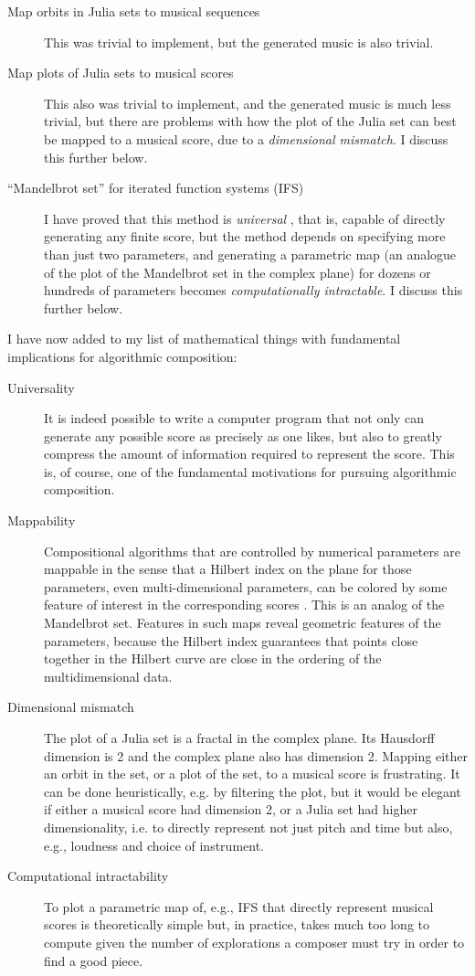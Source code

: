 \documentclass[11pt]{amsart}
\begin{document}
\begin{description}
\item[Map orbits in Julia sets to musical sequences] This was trivial to implement, but the generated music is also trivial.
\item[Map plots of Julia sets to musical scores] This also was trivial to implement, and the generated music is much less trivial, but there are problems with how the plot of the Julia set can best be mapped to a musical score, due to a \emph{dimensional mismatch}. I discuss this further below.
\item[``Mandelbrot set'' for iterated function systems (IFS)] I have proved that this method is \emph{universal} \cite{obsessed, gogins2023scoregraphs}, that is, capable of directly generating any finite score, but the method depends on specifying more than just two parameters, and generating a parametric map (an analogue of the plot of the Mandelbrot set in the complex plane) for dozens or hundreds of parameters becomes \emph{computationally intractable}. I discuss this further below.
\end{description}

I have now added to my list of mathematical things with fundamental implications for algorithmic composition:

\begin{description}
\item[Universality] It is indeed possible to write a computer program that not only can generate any possible score as precisely as one likes, but also to greatly compress the amount of information required to represent the score. This is, of course, one of the fundamental motivations for pursuing algorithmic composition.
\item[Mappability] Compositional algorithms that are controlled by numerical parameters are mappable in the sense that a Hilbert index on the plane for those parameters, even multi-dimensional parameters, can be colored by some feature of interest in the corresponding scores \cite{hamilton2007compact}. This is an analog of the Mandelbrot set. Features in such maps reveal geometric features of the parameters, because the Hilbert index guarantees that points close together in the Hilbert curve are close in the ordering of the multidimensional data.
\item[Dimensional mismatch] The plot of a Julia set is a fractal in the complex plane. Its Hausdorff dimension is 2 and the complex plane also has dimension 2. Mapping either an orbit in the set, or a plot of the set, to a musical score is frustrating. It can be done heuristically, e.g. by filtering the plot, but it would be elegant if either a musical score had dimension 2, or a Julia set had higher dimensionality, i.e. to directly represent not just pitch and time but also, e.g., loudness and choice of instrument.
\item[Computational intractability] To plot a parametric map of, e.g., IFS that directly represent musical scores is theoretically simple but, in practice, takes much too long to compute given the number of explorations a composer must try in order to find a good piece.
\end{description}
\end{document}
